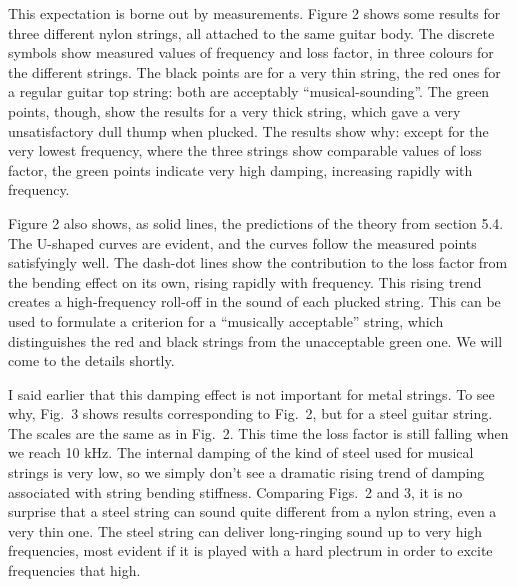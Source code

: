   This expectation is borne out by measurements. Figure 2 shows some results 
  for three different nylon strings, all attached to the same guitar body. The 
  discrete symbols show measured values of frequency and loss factor, in three 
  colours for the different strings. The black points are for a very thin 
  string, the red ones for a regular guitar top string: both are acceptably 
  ``musical-sounding''. The green points, though, show the results for a very 
  thick string, which gave a very unsatisfactory dull thump when plucked. The 
  results show why: except for the very lowest frequency, where the three 
  strings show comparable values of loss factor, the green points indicate very 
  high damping, increasing rapidly with frequency. 

  Figure 2 also shows, as solid lines, the predictions of the theory from 
  section 5.4. The U-shaped curves are evident, and the curves follow the 
  measured points satisfyingly well. The dash-dot lines show the contribution 
  to the loss factor from the bending effect on its own, rising rapidly with 
  frequency. This rising trend creates a high-frequency roll-off in the sound 
  of each plucked string. This can be used to formulate a criterion for a 
  ``musically acceptable'' string, which distinguishes the red and black 
  strings from the unacceptable green one. We will come to the details shortly. 

  I said earlier that this damping effect is not important for metal strings. 
  To see why, Fig.\ 3 shows results corresponding to Fig.\ 2, but for a steel 
  guitar string. The scales are the same as in Fig.\ 2. This time the loss 
  factor is still falling when we reach 10 kHz. The internal damping of the 
  kind of steel used for musical strings is very low, so we simply don't see a 
  dramatic rising trend of damping associated with string bending stiffness. 
  Comparing Figs.\ 2 and 3, it is no surprise that a steel string can sound 
  quite different from a nylon string, even a very thin one. The steel string 
  can deliver long-ringing sound up to very high frequencies, most evident if 
  it is played with a hard plectrum in order to excite frequencies that high. 


